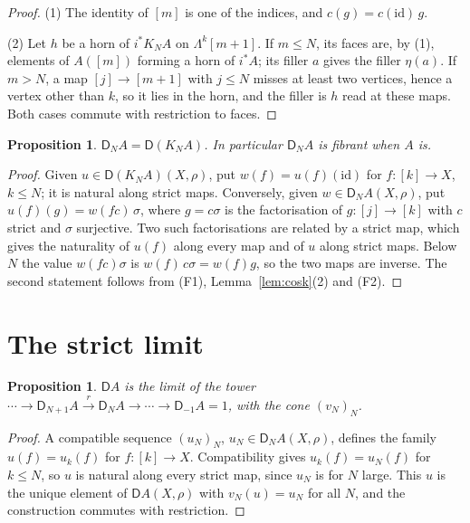 \documentclass[11pt]{article}
\newcommand{\id}{\mathrm{id}}
\newcommand{\D}{\mathsf{D}}
\newcommand{\Lam}{\Lambda}
\theoremstyle{plain}
\newtheorem{proposition}[theorem]{Proposition}
\theoremstyle{definition}
\theoremstyle{remark}
\begin{document}
\begin{proof}
(1) The identity of $[m]$ is one of the indices, and $c(g)=c(\id)\,g$.

(2) Let $h$ be a horn of $i^*K_NA$ on $\Lam^k[m+1]$. If $m\le N$, its faces
are, by (1), elements of $A([m])$ forming a horn of $i^*A$; its filler $a$
gives the filler $\eta(a)$. If $m>N$, a map $[j]\to[m+1]$ with $j\le N$
misses at least two vertices, hence a vertex other than $k$, so it lies in
the horn, and the filler is $h$ read at these maps. Both cases commute with
restriction to faces.
\end{proof}

\begin{proposition}\label{prop:DN}
$\D_NA=\D(K_NA)$. In particular $\D_NA$ is fibrant when $A$ is.
\end{proposition}

\begin{proof}
Given $u\in\D(K_NA)(X,\rho)$, put $w(f)=u(f)(\id)$ for $f:[k]\to X$, $k\le
N$; it is natural along strict maps. Conversely, given $w\in\D_NA(X,\rho)$,
put $u(f)(g)=w(fc)\,\sigma$, where $g=c\sigma$ is the factorisation of
$g:[j]\to[k]$ with $c$ strict and $\sigma$ surjective. Two such
factorisations are related by a strict map, which gives the naturality of
$u(f)$ along every map and of $u$ along strict maps. Below $N$ the value
$w(fc)\sigma$ is $w(f)\,c\sigma=w(f)g$, so the two maps are inverse. The
second statement follows from (F1), Lemma~\ref{lem:cosk}(2) and (F2).
\end{proof}

\section{The strict limit}\label{sec:strict}

\begin{proposition}\label{prop:strict}
$\D A$ is the limit of the tower
$\cdots\to\D_{N+1}A\xrightarrow{r}\D_NA\to\cdots\to\D_{-1}A=1$, with the
cone $(v_N)_N$.
\end{proposition}

\begin{proof}
A compatible sequence $(u_N)_N$, $u_N\in\D_NA(X,\rho)$, defines the family
$u(f)=u_k(f)$ for $f:[k]\to X$. Compatibility gives $u_k(f)=u_N(f)$ for
$k\le N$, so $u$ is natural along every strict map, since $u_N$ is for
$N$ large. This $u$ is the unique element of $\D A(X,\rho)$ with
$v_N(u)=u_N$ for all $N$, and the construction commutes with restriction.
\end{proof}
\end{document}
